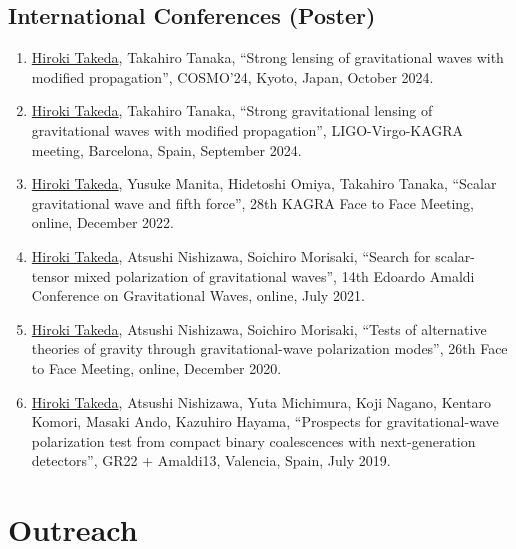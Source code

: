 \documentclass[uplatex, 12pt]{article}
\begin{document}
\subsection*{International Conferences (Poster)}
\begin{enumerate}
\item \uline{Hiroki Takeda}, Takahiro Tanaka, “Strong lensing of gravitational waves with modified propagation”, COSMO'24, Kyoto, Japan, October 2024.
\item \uline{Hiroki Takeda}, Takahiro Tanaka, “Strong gravitational lensing of gravitational waves with modified propagation”, LIGO-Virgo-KAGRA meeting, Barcelona, Spain, September 2024.
\item \uline{Hiroki Takeda}, Yusuke Manita, Hidetoshi Omiya, Takahiro Tanaka, “Scalar gravitational wave and fifth force”, 28th KAGRA Face to Face Meeting, online, December 2022.
\item \uline{Hiroki Takeda}, Atsushi Nishizawa, Soichiro Morisaki, “Search for scalar-tensor mixed polarization of gravitational waves”, 14th Edoardo Amaldi Conference on Gravitational Waves, online, July 2021.
\item \uline{Hiroki Takeda}, Atsushi Nishizawa, Soichiro Morisaki, “Tests of alternative theories of gravity through gravitational-wave polarization modes”, 26th Face to Face Meeting, online, December 2020.
\item \uline{Hiroki Takeda}, Atsushi Nishizawa, Yuta Michimura, Koji Nagano, Kentaro Komori, Masaki Ando, Kazuhiro Hayama, “Prospects for gravitational-wave polarization test from compact binary coalescences with next-generation detectors”, GR22 + Amaldi13, Valencia, Spain, July 2019.
\end{enumerate}


\section*{Outreach}
\end{document}
